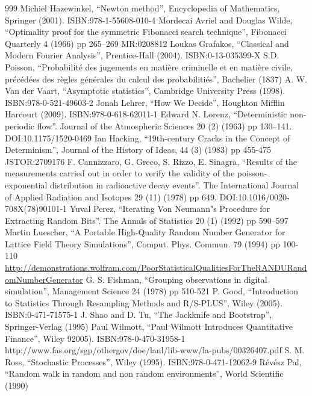 \documentclass[justified, sixbynine]{tufte-book}
\theoremstyle{plain}%
\newtheorem * {corollary}{Corollary}
\theoremstyle{definition}
\theoremstyle{remark}
\newtheorem * {remark}{Remark}
\newtheorem * {note}{Note}
\begin{document}
\begin{thebibliography}{999}
 Michiel Hazewinkel, ``Newton method'', Encyclopedia of Mathematics, Springer (2001). ISBN:978-1-55608-010-4
 Mordecai Avriel and Douglas Wilde, ``Optimality proof for the symmetric Fibonacci search technique'', Fibonacci Quarterly 4 (1966) pp 265–269 MR:0208812
 Loukas Grafakos, ``Classical and Modern Fourier Analysis'', Prentice-Hall (2004). ISBN:0-13-035399-X
 S.D. Poisson, ``Probabilité des jugements en matière criminelle et en matière civile, précédées des règles générales du calcul des probabilitiés'', Bachelier (1837)
 A. W. Van der Vaart, ``Asymptotic statistics'', Cambridge University Press (1998). ISBN:978-0-521-49603-2
 Jonah Lehrer, ``How We Decide'', Houghton Mifflin Harcourt (2009). ISBN:978-0-618-62011-1
 Edward N. Lorenz, ``Deterministic non-periodic flow''. Journal of the Atmospheric Sciences 20 (2) (1963) pp 130–141. DOI:10.1175/1520-0469
 Ian Hacking, ``19th-century Cracks in the Concept of Determinism'', Journal of the History of Ideas, 44 (3) (1983) pp 455-475 JSTOR:2709176
 F. Cannizzaro, G. Greco, S. Rizzo, E. Sinagra, ``Results of the measurements carried out in order to verify the validity of the poisson-exponential distribution in radioactive decay events''. The International Journal of Applied Radiation and Isotopes 29 (11) (1978) pp 649. DOI:10.1016/0020-708X(78)90101-1
 Yuval Perez, ``Iterating Von Neumann"s Procedure for Extracting Random Bits''. The Annals of Statistics 20 (1) (1992) pp 590–597
 Martin Luescher, ``A Portable High-Quality Random Number Generator for Lattice Field Theory Simulations'', Comput. Phys. Commun. 79 (1994) pp 100-110
 \url{http://demonstrations.wolfram.com/PoorStatisticalQualitiesForTheRANDURandomNumberGenerator}
 G. S. Fishman, ``Grouping observations in digital simulation'', Management Science 24 (1978) pp 510-521
 P. Good, ``Introduction to Statistics Through Resampling Methods and R/S-PLUS'', Wiley (2005). ISBN:0-471-71575-1
 J. Shao and D. Tu, ``The Jackknife and Bootstrap'', Springer-Verlag (1995)
 Paul Wilmott, ``Paul Wilmott Introduces Quantitative Finance'', Wiley 92005). ISBN:978-0-470-31958-1
 http://www.fas.org/sgp/othergov/doe/lanl/lib-www/la-pubs/00326407.pdf
 S. M. Ross, ``Stochastic Processes'', Wiley (1995). ISBN:978-0-471-12062-9
 Révész Pal, ``Random walk in random and non random environments'', World Scientific (1990)

\end{thebibliography}
\end{document}
